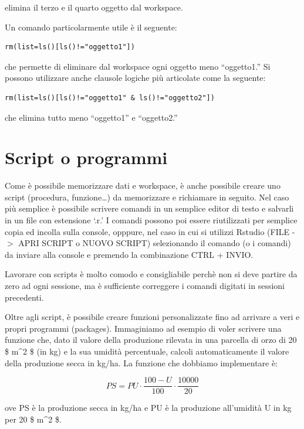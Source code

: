 \documentclass[a4paper,12pt,oneside]{book}
\begin{document}
elimina il terzo e il quarto oggetto dal workspace.

Un comando particolarmente utile è il seguente:

\begin{verbatim}
rm(list=ls()[ls()!="oggetto1"])
\end{verbatim}

che permette di eliminare dal workspace ogni oggetto meno ``oggetto1.'' Si possono utilizzare anche clausole logiche più articolate come la seguente:

\begin{verbatim}
rm(list=ls()[ls()!="oggetto1" & ls()!="oggetto2"])
\end{verbatim}

che elimina tutto meno ``oggetto1'' e ``oggetto2.''

\hypertarget{script-o-programmi}{%
\section*{Script o programmi}\label{script-o-programmi}}

Come è possibile memorizzare dati e workspace, è anche possibile creare uno script (procedura, funzione\ldots) da memorizzare e richiamare in seguito. Nel caso più semplice è possibile scrivere comandi in un semplice editor di testo e salvarli in un file con estensione `.r.' I comandi possono poi essere riutilizzati per semplice copia ed incolla sulla console, opppure, nel caso in cui si utilizzi Rstudio (FILE -\(>\) APRI SCRIPT o NUOVO SCRIPT) selezionando il comando (o i comandi) da inviare alla console e premendo la combinazione CTRL + INVIO.

Lavorare con scripts è molto comodo e consigliabile perchè non si deve partire da zero ad ogni sessione, ma è sufficiente correggere i comandi digitati in sessioni precedenti.

Oltre agli script, è possibile creare funzioni personalizzate fino ad arrivare a veri e propri programmi (packages). Immaginiamo ad esempio di voler scrivere una funzione che, dato il valore della produzione rilevata in una parcella di orzo di 20 \$ m\^{}2 \$ (in kg) e la sua umidità percentuale, calcoli automaticamente il valore della
produzione secca in kg/ha. La funzione che dobbiamo implementare è:

\[
PS = PU \cdot \frac{100 - U}{100} \cdot \frac{10000}{20}
\]

ove PS è la produzione secca in kg/ha e PU è la produzione all'umidità U in kg per 20 \$ m\^{}2 \$.
\end{document}
